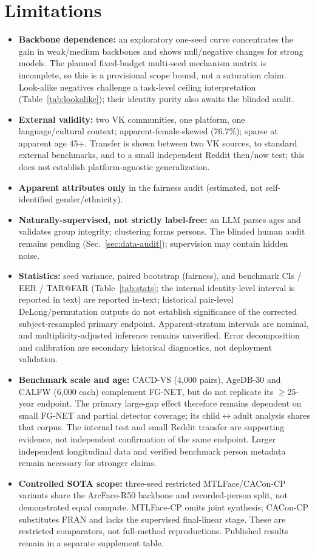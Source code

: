 \documentclass[journal]{IEEEtran}
\begin{document}
\section{Limitations}\label{sec:limitations}
\begin{itemize}[leftmargin=1.2em]
\item \textbf{Backbone dependence:} an exploratory one-seed curve concentrates the gain in weak/medium backbones and shows null/negative changes for strong models. The planned fixed-budget multi-seed mechanism matrix is incomplete, so this is a provisional scope bound, not a saturation claim. Look-alike negatives challenge a task-level ceiling interpretation (Table~\ref{tab:lookalike}); their identity purity also awaits the blinded audit.
\item \textbf{External validity:} two VK communities, one platform, one language/cultural context; apparent-female-skewed (76.7\%); sparse at apparent age 45+. Transfer is shown between two VK sources, to standard external benchmarks, and to a small independent Reddit then/now test; this does not establish platform-agnostic generalization.
\item \textbf{Apparent attributes only} in the fairness audit (estimated, not self-identified gender/ethnicity).
\item \textbf{Naturally-supervised, not strictly label-free:} an LLM parses ages and validates group integrity; clustering forms persons. The blinded human audit remains pending (Sec.~\ref{sec:data-audit}); supervision may contain hidden noise.
\item \textbf{Statistics:} seed variance, paired bootstrap (fairness), and benchmark CIs / EER / TAR@FAR (Table~\ref{tab:stats}; the internal identity-level interval is reported in text) are reported in-text; historical pair-level DeLong/permutation outputs do not establish significance of the corrected subject-resampled primary endpoint. Apparent-stratum intervals are nominal, and multiplicity-adjusted inference remains unverified. Error decomposition and calibration are secondary historical diagnostics, not deployment validation.
\item \textbf{Benchmark scale and age:} CACD-VS (4{,}000 pairs), AgeDB-30 and CALFW (6{,}000 each) complement FG-NET, but do not replicate its $\geq$25-year endpoint. The primary large-gap effect therefore remains dependent on small FG-NET and partial detector coverage; its child$\leftrightarrow$adult analysis shares that corpus. The internal test and small Reddit transfer are supporting evidence, not independent confirmation of the same endpoint. Larger independent longitudinal data and verified benchmark person metadata remain necessary for stronger claims.
\item \textbf{Controlled SOTA scope:} three-seed restricted MTLFace/CACon-CP variants share the ArcFace-R50 backbone and recorded-person split, not demonstrated equal compute. MTLFace-CP omits joint synthesis; CACon-CP substitutes FRAN and lacks the supervised final-linear stage. These are restricted comparators, not full-method reproductions. Published results remain in a separate supplement table.
\end{itemize}
\end{document}
